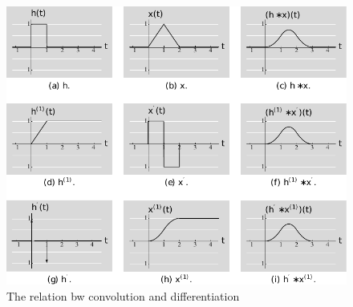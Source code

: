 \documentclass{article}
\begin{document}
\begin{figure}
\centering
\includegraphics[scale=0.7]{fig/diff_conv.pdf}
\caption{The relation bw convolution and differentiation}
\label{fig:diff_conv}
\end{figure}


\end{document}
